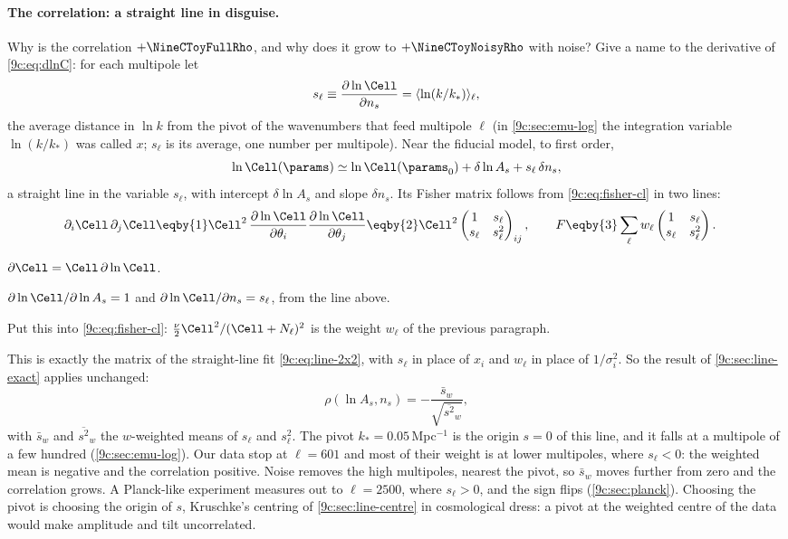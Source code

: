 \paragraph{The correlation: a straight line in disguise.} Why is the correlation $+\NineCToyFullRho$, and why does it
grow to $+\NineCToyNoisyRho$ with noise? Give a name to the derivative of \eqref{9c:eq:dlnC}: for each multipole let
\[
  s_\ell\equiv\frac{\partial\ln\Cell}{\partial n_s}=\langle\ln(k/k_*)\rangle_\ell ,
\]
the average distance in $\ln k$ from the pivot of the wavenumbers that feed multipole $\ell$ (in \cref{9c:sec:emu-log}
the integration variable $\ln(k/k_*)$ was called $x$; $s_\ell$ is its average, one number per multipole). Near the
fiducial model, to first order,
\[
  \ln\Cell(\params)\simeq\ln\Cell(\params_0)+\delta\ln A_s+s_\ell\,\delta n_s,
\]
a straight line in the variable $s_\ell$, with intercept $\delta\ln A_s$ and slope $\delta n_s$. Its Fisher matrix
follows from \eqref{9c:eq:fisher-cl} in two lines:
\begin{align}
  \partial_i\Cell\,\partial_j\Cell
  &\eqby{1}\Cell^2\,\frac{\partial\ln\Cell}{\partial\theta_i}\frac{\partial\ln\Cell}{\partial\theta_j}
   \eqby{2}\Cell^2\begin{pmatrix}1&s_\ell\\s_\ell&s_\ell^2\end{pmatrix}_{ij},
  \qquad
  F\eqby{3}\sum_\ell w_\ell\begin{pmatrix}1&s_\ell\\s_\ell&s_\ell^2\end{pmatrix}.
  \label{9c:eq:toy-fisher}
\end{align}
\begin{explain}
  \item $\partial\Cell=\Cell\,\partial\ln\Cell$.
  \item $\partial\ln\Cell/\partial\ln A_s=1$ and $\partial\ln\Cell/\partial n_s=s_\ell$, from the line above.
  \item Put this into \eqref{9c:eq:fisher-cl}: $\frac\nu2\Cell^2/(\Cell+N_\ell)^2$ is the weight $w_\ell$ of the previous
        paragraph.
\end{explain}
This is exactly the matrix of the straight-line fit \eqref{9c:eq:line-2x2}, with $s_\ell$ in place of $x_i$ and $w_\ell$ in
place of $1/\sigma_i^2$. So the result of \cref{9c:sec:line-exact} applies unchanged:
\[
  \rho(\ln A_s,n_s)=-\frac{\bar s_w}{\sqrt{\overline{s^2}_w}} ,
\]
with $\bar s_w$ and $\overline{s^2}_w$ the $w$-weighted means of $s_\ell$ and $s_\ell^2$. The pivot $k_*=0.05$\,Mpc$^{-1}$ is
the origin $s=0$ of this line, and it falls at a multipole of a few hundred (\cref{9c:sec:emu-log}). Our data stop at
$\ell=601$ and most of their weight is at lower multipoles, where $s_\ell<0$: the weighted mean is negative and the
correlation positive. Noise removes the high multipoles, nearest the pivot, so $\bar s_w$ moves further from zero and
the correlation grows. A Planck-like experiment measures out to $\ell=2500$, where $s_\ell>0$, and the sign flips
(\cref{9c:sec:planck}). Choosing the pivot is choosing the origin of $s$, Kruschke's centring of
\cref{9c:sec:line-centre} in cosmological dress: a pivot at the weighted centre of the data would make amplitude and
tilt uncorrelated.

